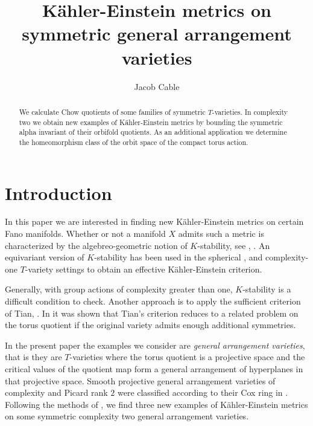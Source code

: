 \documentclass{amsart}
\title[K\"ahler-Einstein metrics on symmetric general arrangement varieties]{K\"ahler-Einstein metrics on symmetric general arrangement varieties}
\author[J. Cable]{Jacob Cable}
\theoremstyle{definition}
\begin{document}
\begin{abstract}
  We calculate Chow quotients of some families of symmetric \(T\)-varieties. In complexity two we obtain new examples of K\"ahler-Einstein metrics by bounding the symmetric alpha invariant of their orbifold quotients. As an additional application we determine the homeomorphism class of the orbit space of the compact torus action.
\end{abstract}
\maketitle
\section{Introduction}

In this paper we are interested in finding new K\"ahler-Einstein metrics on certain Fano manifolds. Whether or not a manifold \(X\) admits such a metric is characterized by the algebreo-geometric notion of \(K\)-stability, see \cite{CDS12}, \cite{CDS13}. An equivariant version of \(K\)-stability has been used in the spherical \cite{del2016}, and complexity-one \(T\)-variety \cite{ilten2015} settings to obtain an effective K\"ahler-Einstein criterion.

Generally, with group actions of complexity greater than one, \(K\)-stability is a difficult condition to check. Another approach is to apply the sufficient criterion of Tian, \cite{Tian87}. In \cite{Su13} it was shown that Tian's criterion reduces to a related problem on the torus quotient if the original variety admits enough additional symmetries.

In the present paper the examples we consider are \textit{general arrangement varieties}, that is they are \(T\)-varieties where the torus quotient is a projective space and the critical values of the quotient map form a general arrangement of hyperplanes in that projective space. Smooth projective general arrangement varieties of complexity and Picard rank \(2\) were classified according to their Cox ring in \cite{hausen2018torus}. Following the methods of \cite{Su13}, we find three new examples of K\"ahler-Einstein metrics on some symmetric complexity two general arrangement varieties.
\end{document}
